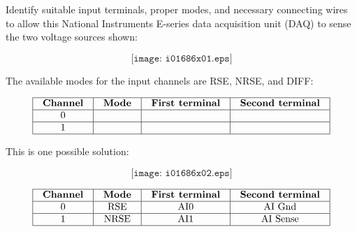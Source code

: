 

Identify suitable input terminals, proper modes, and necessary connecting wires to allow this National Instruments E-series data acquisition unit (DAQ) to sense the two voltage sources shown:

$$\texttt{[image: i01686x01.eps]}$$

The available modes for the input channels are RSE, NRSE, and DIFF:


$$\vbox{\offinterlineskip
\halign{\strut
\vrule \quad\hfil # \ \hfil & 
\vrule \quad\hfil # \ \hfil & 
\vrule \quad\hfil # \ \hfil & 
\vrule \quad\hfil # \ \hfil \vrule \cr
\noalign{\hrule}
%
{\bf Channel} & {\bf Mode} & {\bf First terminal} & {\bf Second terminal} \cr
%
\noalign{\hrule}
%
0 &  &  &  \cr
%
\noalign{\hrule}
%
1 &  &  &  \cr
%
\noalign{\hrule}
} %
}$$ %

\vfil 

\eject






This is one possible solution:

$$\texttt{[image: i01686x02.eps]}$$


$$\vbox{\offinterlineskip
\halign{\strut
\vrule \quad\hfil # \ \hfil & 
\vrule \quad\hfil # \ \hfil & 
\vrule \quad\hfil # \ \hfil & 
\vrule \quad\hfil # \ \hfil \vrule \cr
\noalign{\hrule}
%
{\bf Channel} & {\bf Mode} & {\bf First terminal} & {\bf Second terminal} \cr
%
\noalign{\hrule}
%
0 & RSE & AI0 & AI Gnd \cr
%
\noalign{\hrule}
%
1 & NRSE & AI1 & AI Sense \cr
%
\noalign{\hrule}
} %
}$$ %











